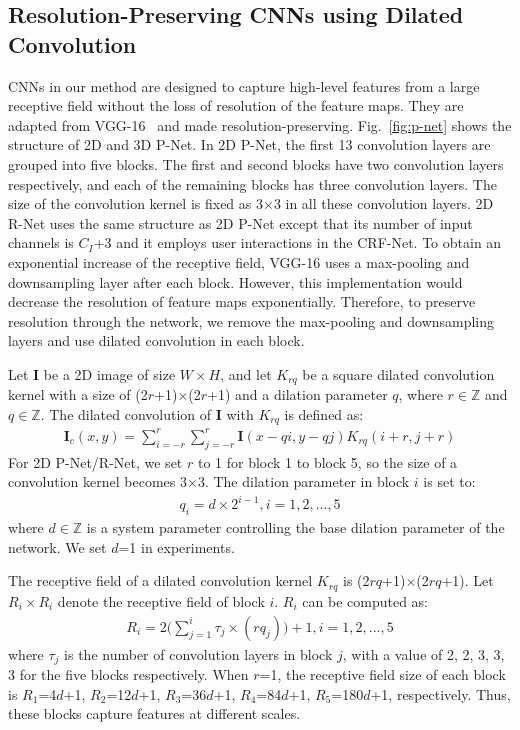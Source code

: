 \documentclass[10pt,journal,compsoc]{IEEEtran}
\begin{document}
	


\subsection{Resolution-Preserving CNNs using Dilated Convolution}\label{method:cnn_structures}
CNNs in our method are designed to capture high-level features from a large receptive field without the loss of resolution of the feature maps. They are adapted from VGG-16~\cite{Simonyan2015} and made resolution-preserving. Fig.~\ref{fig:p-net} shows the structure of 2D and 3D P-Net. In 2D P-Net, the first 13 convolution layers are grouped into five blocks. The first and second blocks have two convolution layers respectively, and each of the remaining blocks has three convolution layers. The size of the convolution kernel is fixed as 3$\times$3 in all these convolution layers.  2D R-Net uses the same structure as 2D P-Net except that its number of input channels is $C_I$+3 and it employs user interactions in the CRF-Net. To obtain an exponential increase of the receptive field, VGG-16 uses a max-pooling and downsampling layer after each block. However, this implementation would decrease the resolution of feature maps exponentially. Therefore, to preserve resolution through the network, we remove the max-pooling and downsampling layers and use dilated convolution in each block. 


Let $\mathbf{I}$ be a 2D image of size $W\times H$, and let $K_{rq}$ be a square dilated convolution kernel with a size of (2$r$+1)$\times$(2$r$+1) and a dilation parameter $q$, where $r\in \mathbb{Z}$ and $q\in \mathbb{Z}$. The dilated convolution of $\mathbf{I}$ with $K_{rq}$ is defined as:
\begin{align}
\mathbf{I}_c(x,y)= \sum_{i=-r}^{r}\sum_{j=-r}^{r}\mathbf{I}(x-qi, y-qj)K_{rq}(i+r,j+r) 
\label{eq:dilated_convolution}
\end{align}
For 2D P-Net/R-Net, we set $r$ to 1 for block 1 to block 5, so the size of a convolution kernel becomes 3$\times$3. The dilation parameter in block $i$ is set to:
\begin{align}
q_i= d\times2^{i-1},  i=1,2,..., 5
\label{eq:dilated_factor}
\end{align}
 where $d \in \mathbb{Z}$ is a system parameter controlling the base dilation parameter of the network. We set $d$=1 in experiments.


The receptive field of a dilated convolution kernel $K_{rq}$ is (2$rq$+1)$\times$(2$rq$+1). Let $R_i\times R_i$ denote the receptive field of block $i$.  $R_i$ can be computed as:  
\begin{align}
	R_i = 2\Big(\sum_{j=1}^{i}{\tau_j \times (rq_j)\Big)}+1, i=1,2,...,5
	\label{eq:receptive_field}
\end{align}
where $\tau_j$ is the number of convolution layers in block $j$, with a value of 2, 2, 3, 3, 3 for the five blocks respectively.  
When $r$=1, the receptive field size of each block is $R_1$=4$d$+1, $R_2$=12$d$+1, $R_3$=36$d$+1, $R_4$=84$d$+1, $R_5$=180$d$+1, respectively. Thus, these blocks capture features at different scales. 
\end{document}
